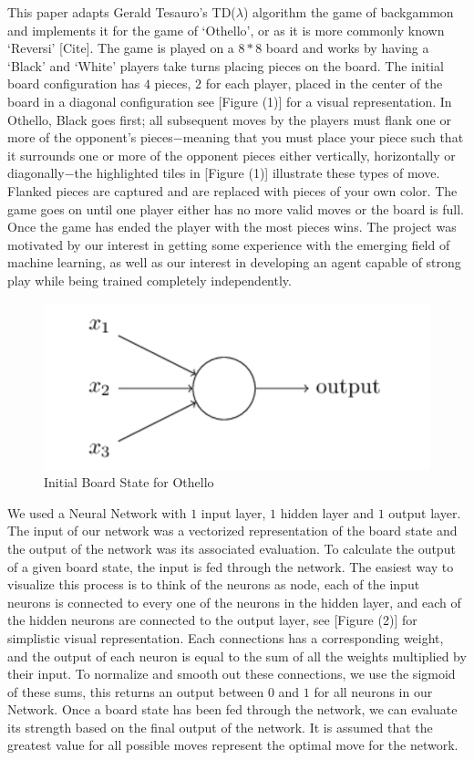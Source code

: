 \documentclass{sig-alternate-05-2015}
\begin{document}
This paper adapts Gerald Tesauro's TD(\(\lambda\)) algorithm the game of backgammon and implements it for the game of `Othello', or as it is more commonly known `Reversi' [Cite]. The game is played on a $8*8$ board and works by having a `Black' and `White' players take turns placing pieces on the board. The initial board configuration has $4$ pieces, $2$ for each player, placed in the center of the board in a diagonal configuration see [Figure (1)] for a visual representation. In Othello, Black goes first; all subsequent moves by the players  must flank one or more of the opponent's pieces$-$meaning that you must place your piece such that it surrounds one or more of the opponent pieces either vertically, horizontally or diagonally$-$the highlighted tiles in [Figure (1)] illustrate these types of move. Flanked pieces are captured and are replaced with pieces of your own color. The game goes on until one player either has no more valid moves or the board is full. Once the game has ended the player with the most pieces wins. The project was motivated by our interest in getting some experience with the emerging field of machine learning, as well as our interest in developing an agent capable of strong play while being trained completely independently.

\begin{figure}[h!]
  \includegraphics[width=\linewidth]{neuron.png}
  \caption{Initial Board State for Othello}
  \label{fig:neuron1}
\end{figure}



We used a Neural Network with $1$ input layer, $1$ hidden layer and $1$ output layer. The input of our network was a vectorized representation of the board state and the output of the network was its associated evaluation. To calculate the output of a given board state, the input is fed through the network. The easiest way to visualize this process is to think of the neurons as node, each of the input neurons is connected to every one of the neurons in the hidden layer, and each of the hidden neurons are connected to the output layer, see [Figure (2)] for simplistic visual representation. Each connections has a corresponding weight, and the output of each neuron is equal to the sum of all the weights multiplied by their input. To normalize and smooth out these connections, we use the sigmoid of these sums, this returns an output between $0$ and $1$ for all neurons in our Network. Once a board state has been fed through the network, we can evaluate its strength based on the final output of the network. It is assumed that the greatest value for all possible moves represent the optimal move for the network.
\end{document}
